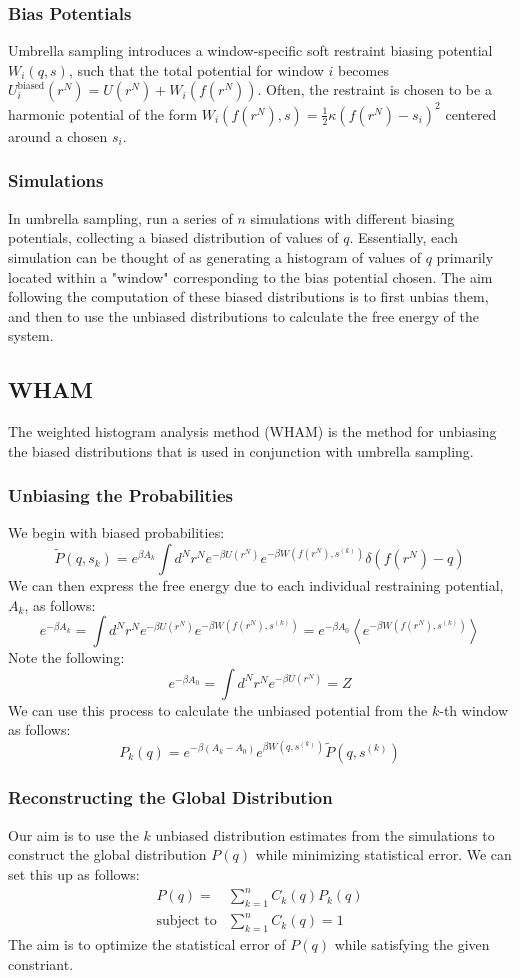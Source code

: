 \documentclass{article}
\begin{document}
\subsubsection{Bias Potentials}
Umbrella sampling introduces a window-specific soft restraint biasing potential $W_i(q, s)$, such that the total potential for window $i$ becomes $U_i^\text{biased}(r^N) = U(r^N) + W_i(f(r^N))$.
Often, the restraint is chosen to be a harmonic potential of the form $W_i(f(r^N),s) = \frac{1}{2} \kappa (f(r^N) - s_i)^2$ centered around a chosen $s_i$.

\subsubsection{Simulations}
In umbrella sampling, run a series of $n$ simulations with different biasing potentials, collecting a biased distribution of values of $q$.
Essentially, each simulation can be thought of as generating a histogram of values of $q$ primarily located within a "window" corresponding to the bias potential chosen.
The aim following the computation of these biased distributions is to first unbias them, and then to use the unbiased distributions to calculate the free energy of the system.

\subsection{WHAM}
The weighted histogram analysis method (WHAM) is the method for unbiasing the biased distributions that is used in conjunction with umbrella sampling.

\subsubsection{Unbiasing the Probabilities}
We begin with biased probabilities:
$$\tilde{P}(q, s_k) = e^{\beta A_k} \int d^N r^N e^{-\beta U(r^N)} e^{- \beta W(f(r^N), s^{(k)})}\delta(f(r^N) - q)$$
We can then express the free energy due to each individual restraining potential, $A_k$, as follows:
$$e^{-\beta A_k} = \int d^N r^N e^{-\beta U(r^N)} e^{-\beta W(f(r^N), s^{(k)})} = e^{-\beta A_0} \left \langle e^{- \beta W(f(r^N), s^{(k)})} \right \rangle$$
Note the following:
$$e^{-\beta A_0} = \int d^N r^N e^{-\beta U(r^N)} = Z$$
We can use this process to calculate the unbiased potential from the $k$-th window as follows:
$$ P_k(q) = e^{-\beta(A_k - A_0)} e^{\beta W\left(q, s^{(k)}\right)} \tilde{P}(q, s^{(k)}) $$

\subsubsection{Reconstructing the Global Distribution}
Our aim is to use the $k$ unbiased distribution estimates from the simulations to construct the global distribution $P(q)$ while minimizing statistical error.
We can set this up as follows:
\begin{align*}
    P(q) = &\sum_{k=1}^n C_k(q) P_k(q)\\
    \text{subject to} &\sum_{k=1}^n C_k(q) = 1
\end{align*}
The aim is to optimize the statistical error of $P(q)$ while satisfying the given constriant.
\end{document}
